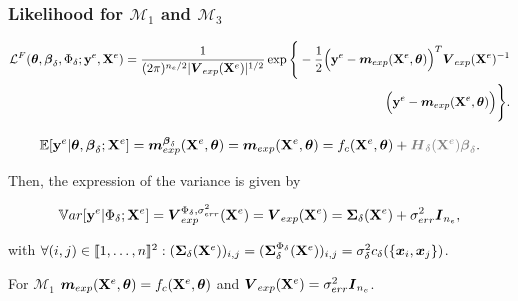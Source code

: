 \documentclass[nopagenumber,9pt]{beamer}
\begin{document}
\begin{frame}
 \frametitle{Likelihood for $\mathcal{M}_1$ and $\mathcal{M}_3$}
 
 
 \begin{equation*}
\begin{split}
\mathcal{L}^{F}(\boldsymbol{\theta},\boldsymbol{\beta}_{\delta},\Phi_{\delta};\mathbf{y}^{e},\mathbf{X}^e)=\frac{1}{(2\pi)^{n_e/2}|\boldsymbol{V}_{exp}(\mathbf{X}^e)|^{1/2}}\exp\Bigg\{-\frac{1}{2}\Big(\mathbf{y}^{e}-\boldsymbol{m}_{exp}(\mathbf{X}^e,\boldsymbol{\theta})\Big)^T\boldsymbol{V}_{exp}(\mathbf{X}^e)^{-1}\\
\Big(\mathbf{y}^{e}-\boldsymbol{m}_{exp}(\mathbf{X}^e,\boldsymbol{\theta})\Big)\Bigg\}.
\end{split}
\label{eq:LikelihoodQuick2}
\end{equation*}
 
\begin{equation*}
\mathbb{E}[\byexp|\btheta,\boldsymbol{\beta}_{\delta};\bXexp] = \boldsymbol{m}_{exp}^{\boldsymbol{\beta}_{\delta}}(\bXexp,\btheta) = \boldsymbol{m}_{exp}(\bXexp,\btheta) = f_c(\bXexp,\btheta) + {\color{gray} {\boldsymbol{H}_{\delta}}(\bXexp)\boldsymbol{\beta}_{\delta}}.
\end{equation*}

Then, the expression of the variance is given by

\begin{equation*}
\mathbb{V}ar[\mathbf{y}^{e}|\Phi_{\delta};\mathbf{X}^e] = \boldsymbol{V}_{exp}^{\Phi_{\delta},\sigma_{err}^2}(\mathbf{X}^e)= \boldsymbol{V}_{exp}(\mathbf{X}^e) = \boldsymbol{\Sigma}_{\delta}(\mathbf{X}^e) + \sigma_{err}^2\boldsymbol{I}_{n_e},
\end{equation*}


with $\forall (i,j) \in \llbracket1,\dots,n\rrbracket^2: (\boldsymbol{\Sigma}_{\delta}(\mathbf{X}^e))_{i,j} =(\boldsymbol{\Sigma}^{\Phi_{\delta}}_{\delta}(\mathbf{X}^e))_{i,j}=\sigma^2_{\delta} c_{\delta}(\{\boldsymbol{x}_i,\boldsymbol{x}_j\})$.


\bigskip

\begin{beamerboxesrounded}{For $\mathcal{M}_1$}
 $\boldsymbol{m}_{exp}(\mathbf{X}^e,\boldsymbol{\theta})= f_c(\mathbf{X}^e,\boldsymbol{\theta})$ and $\boldsymbol{V}_{exp}(\mathbf{X}^e)=\sigma_{err}^2\boldsymbol{I}_{n_e}$.
\end{beamerboxesrounded}

\end{frame}
\end{document}
